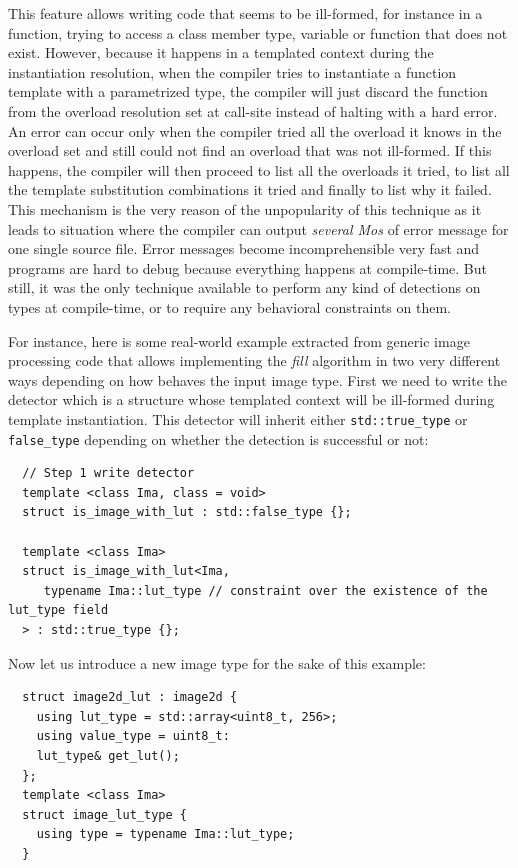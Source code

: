 This feature allows writing code that seems to be ill-formed, for instance in a function, trying to access a class
member type, variable or function that does not exist. However, because it happens in a templated context during the
instantiation resolution, when the compiler tries to instantiate a function template with a parametrized type, the
compiler will just discard the function from the overload resolution set at call-site instead of halting with a hard
error. An error can occur only when the compiler tried all the overload it knows in the overload set and still could not
find an overload that was not ill-formed. If this happens, the compiler will then proceed to list all the overloads it
tried, to list all the template substitution combinations it tried and finally to list why it failed. This mechanism is
the very reason of the unpopularity of this technique as it leads to situation where the compiler can output
\emph{several Mos} of error message for one single source file. Error messages become incomprehensible very fast and
programs are hard to debug because everything happens at compile-time. But still, it was the only technique available to
perform any kind of detections on types at compile-time, or to require any behavioral constraints on them.

For instance, here is some real-world example extracted from generic image processing code that allows implementing the
\emph{fill} algorithm in two very different ways depending on how behaves the input image type. First we need to write
the detector which is a structure whose templated context will be ill-formed during template instantiation. This
detector will inherit either \texttt{std::true\_type} or \texttt{false\_type} depending on whether the detection is
successful or not:

\begin{verbatim}
  // Step 1 write detector
  template <class Ima, class = void>
  struct is_image_with_lut : std::false_type {};

  template <class Ima>
  struct is_image_with_lut<Ima,
     typename Ima::lut_type // constraint over the existence of the lut_type field
  > : std::true_type {};
\end{verbatim}

Now let us introduce a new image type for the sake of this example:

\begin{verbatim}
  struct image2d_lut : image2d {
    using lut_type = std::array<uint8_t, 256>;
    using value_type = uint8_t:
    lut_type& get_lut();
  };
  template <class Ima>
  struct image_lut_type {
    using type = typename Ima::lut_type;
  }
\end{verbatim}

